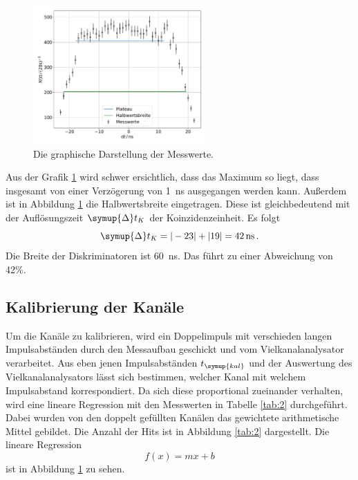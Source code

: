 \documentclass[
  bibliography=totoc,     %
  captions=tableheading,  %
  titlepage=firstiscover, %
]{scrartcl}
\begin{document}
\begin{figure}
  \centering
  \includegraphics[width=0.59\textwidth]{Plateau16.pdf}
  \caption{Die graphische Darstellung der Messwerte.}
  \label{fig:2}
\end{figure}

Aus der Grafik \ref{fig:2} wird schwer ersichtlich, dass das Maximum so
liegt, dass insgesamt von einer Verzögerung von \SI{1}{\nano\second} ausgegangen
werden kann.
Außerdem ist in Abbildung \ref{fig:2} die Halbwertsbreite eingetragen.
Diese ist
gleichbedeutend mit der Auflösungszeit $\symup{\Delta}t_K$ der Koinzidenzeinheit.
Es folgt
\begin{equation}
  \symup{\Delta}t_K = |-23| + |19| = \SI{42}{\nano\second} \, .
\end{equation}
Die Breite der Diskriminatoren ist \SI{60}{\nano\second}. Das führt zu einer
Abweichung von 42\%.

\subsection{Kalibrierung der Kanäle}
\label{sec:kal}
Um die Kanäle zu kalibrieren, wird ein Doppelimpuls mit verschieden langen Impulsabständen
durch den Messaufbau geschickt und vom Vielkanalanalysator verarbeitet. Aus eben jenen
Impulsabständen $t_{\symup{kal}}$ und der Auswertung des Vielkanalanalysators lässt sich bestimmen, welcher
Kanal mit welchem Impulsabstand korrespondiert. Da sich diese proportional zueinander
verhalten, wird eine lineare Regression mit den Messwerten in Tabelle \ref{tab:2}
durchgeführt. Dabei wurden von den doppelt gefüllten Kanälen das gewichtete
arithmetische Mittel gebildet. Die Anzahl der Hits ist in Abbildung \ref{tab:2}
dargestellt.
Die lineare Regression
\begin{equation*}
  f(x) = mx + b
\end{equation*}
ist in Abbildung \ref{fig:2} zu sehen.
\end{document}
